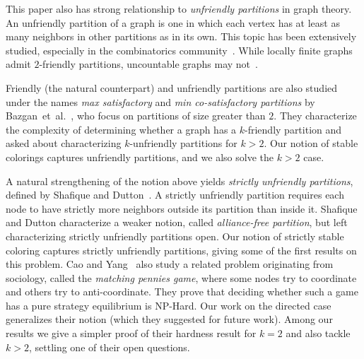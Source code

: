 \documentclass{llncs}
\begin{document}
This paper also has strong relationship to \emph{unfriendly
partitions} in graph theory.  An unfriendly partition of a graph is one in
which each vertex has at least as many neighbors in other partitions as in its
own.  This topic has been extensively studied, especially in the combinatorics
community~\cite{AharoniMP90,BruhnDGS10,CowanE,ShelahM90}.
While locally finite graphs admit $2$-friendly partitions, uncountable graphs 
may not~\cite{ShelahM90}.

Friendly (the natural counterpart) and unfriendly partitions are also studied
under the names \emph{max satisfactory} and \emph{min co-satisfactory
partitions} by Bazgan~et~al.~\cite{BazganTV10}, who focus on partitions of
size greater than $2$.  They characterize the complexity of determining
whether a graph has a $k$-friendly partition and asked about characterizing
$k$-unfriendly partitions for $k > 2$.  Our notion of stable colorings captures
unfriendly partitions, and we also solve the $k>2$ case.

A natural strengthening of the notion above yields \emph{strictly
unfriendly partitions},  defined by Shafique and
Dutton~\cite{ShafiqueD09}.  A strictly unfriendly partition requires each
node to have strictly more neighbors outside its partition than inside it.
Shafique and Dutton characterize a weaker notion, called
\emph{alliance-free partition}, but left characterizing strictly unfriendly
partitions open.  Our notion of strictly stable coloring captures 
strictly unfriendly partitions,
giving some of the first results on this problem.
Cao and Yang~\cite{CaoY12a} also study
a related problem originating from sociology, called the
\emph{matching pennies game}, %
where some
nodes try to coordinate and others try to anti-coordinate.  They prove that 
deciding whether such a game has a pure strategy equilibrium is NP-Hard.  Our
work on the directed case generalizes their notion (which they suggested for future work). 
 Among our results we give a simpler proof of their
hardness result for $k=2$ and also tackle  $k >2$, settling one of their open
questions.
\end{document}
